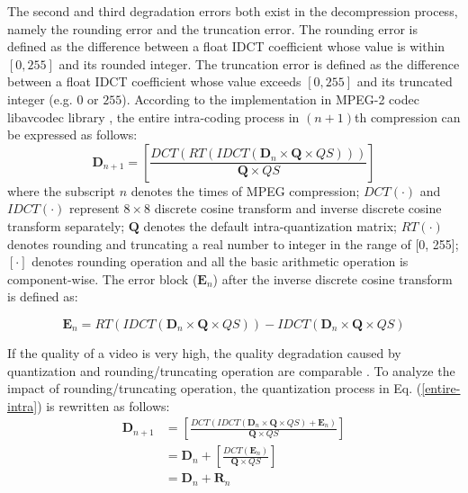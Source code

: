\documentclass[journal,sort]{IEEEtran}
\begin{document}
The second and third degradation errors both exist in the decompression process, namely the rounding error and the truncation error. The rounding error is defined as the difference between a float IDCT coefficient whose value is within $[0,255]$ and its rounded integer. The truncation error is defined as the difference between a float IDCT coefficient whose value exceeds $[0,255]$ and its truncated integer (e.g. $0$ or $255$). According to the implementation in MPEG-2 codec libavcodec library \cite{FFmpeg}, the entire intra-coding process in $(n+1)$th compression can be expressed as follows:
\begin{equation}
\mathbf{D}_{n+1}= \left[\frac{DCT(RT(IDCT(\mathbf{D}_n\times\mathbf{Q}\times QS)))}{\mathbf{Q}\times QS}\right] 
\label{entire-intra}
\end{equation}
where the subscript $n$ denotes the times of MPEG compression; $DCT(\cdot)$ and $IDCT(\cdot)$ represent $8\times8$ discrete cosine transform and inverse discrete cosine transform separately; $\mathbf{Q}$ denotes the default intra-quantization matrix; $RT(\cdot)$ denotes rounding and truncating a real number to integer in the range of [0, 255]; $[\cdot]$ denotes rounding operation and all the basic arithmetic operation is component-wise. The error block ($\mathbf{E}_n$) after the inverse discrete cosine transform is defined as:

\begin{equation}
\mathbf{E}_n= RT(IDCT(\mathbf{D}_n\times\mathbf{Q}\times QS))-IDCT(\mathbf{D}_n\times\mathbf{Q}\times QS)
\label{error-define}
\end{equation}

If the quality of a video is very high, the quality degradation caused by quantization and rounding/truncating operation are comparable \cite{sorial1998degradation}. To analyze the impact of rounding/truncating operation, the quantization process in Eq. (\ref{entire-intra}) is rewritten as follows:
\begin{equation}
\begin{aligned}
\mathbf{D}_{n+1} & =\left[\frac{DCT(IDCT(\mathbf{D}_n\times\mathbf{Q}\times QS)+\mathbf{E}_n)}{\mathbf{Q}\times QS}\right]\\
& = \mathbf{D}_n + \left[\frac{DCT(\mathbf{E}_n)}{\mathbf{Q}\times QS}\right]\\
& = \mathbf{D}_n + \mathbf{R}_n
\label{intra-n+1}
\end{aligned}
\end{equation}
\end{document}
